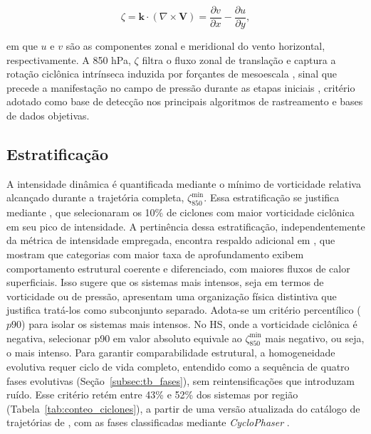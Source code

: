 \begin{equation}\label{eq:vorticidad_relativa}
\zeta = \mathbf{k} \cdot (\nabla \times \mathbf{V}) = \frac{\partial v}{\partial x} - \frac{\partial u}{\partial y},
\end{equation}

\noindent em que $u$ e $v$ são as componentes zonal e meridional do vento horizontal, respectivamente.
A 850 hPa, $\zeta$ filtra o fluxo zonal de translação e captura a rotação ciclônica intrínseca induzida por forçantes de mesoescala \citep{hoskins2005new}, sinal que precede a manifestação no campo de pressão durante as etapas iniciais \citep{sinclair1994objective}, critério adotado como base de detecção nos principais algoritmos de rastreamento e bases de dados objetivas.

\subsection{Estratificação}\label{subsec:tb_poblaciones}
A intensidade dinâmica é quantificada mediante o mínimo de vorticidade relativa alcançado durante a trajetória completa, $\zeta_{850}^{\min}$.
Essa estratificação se justifica mediante \citet{priestley2022improved}, que selecionaram os 10\% de ciclones com maior vorticidade ciclônica em seu pico de intensidade.
A pertinência dessa estratificação, independentemente da métrica de intensidade empregada, encontra respaldo adicional em \citet{andrade2024composite}, que mostram que categorias com maior taxa de aprofundamento exibem comportamento estrutural coerente e diferenciado, com maiores fluxos de calor superficiais.
Isso sugere que os sistemas mais intensos, seja em termos de vorticidade ou de pressão, apresentam uma organização física distintiva que justifica tratá-los como subconjunto separado.
Adota-se um critério percentílico ($p90$) para isolar os sistemas mais intensos.
No HS, onde a vorticidade ciclônica é negativa, selecionar p90 em valor absoluto equivale ao $\zeta_{850}^{\min}$ mais negativo, ou seja, o mais intenso.
Para garantir comparabilidade estrutural, a homogeneidade evolutiva requer ciclo de vida completo, entendido como a sequência de quatro fases evolutivas (Seção~\ref{subsec:tb_fases}), sem reintensificações que introduzam ruído.
Esse critério retém entre 43\% e 52\% dos sistemas por região (Tabela~\ref{tab:conteo_ciclones}), a partir de uma versão atualizada do catálogo de trajetórias de \citet{gramcianinov2020analysis}, com as fases classificadas mediante \textit{CycloPhaser} \citep{coutodesouza2024new, deSouza2025CycloPhaser}.
